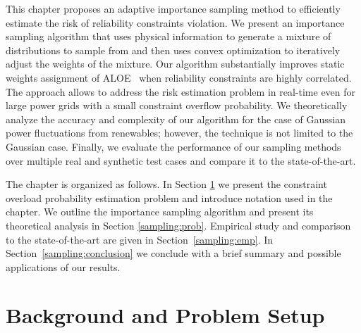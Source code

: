 This chapter proposes an adaptive importance sampling method to efficiently estimate the risk of reliability constraints violation.
We present an importance sampling algorithm that uses physical information to generate a mixture of distributions to sample from and then uses convex optimization to iteratively adjust the weights of the mixture. Our algorithm substantially improves static weights assignment of ALOE~\cite{owen2019importance} when reliability constraints are highly correlated.
The approach allows to address the risk estimation problem in real-time even for large power grids with a small constraint overflow probability. We theoretically analyze the accuracy and complexity of our algorithm for the case of Gaussian power fluctuations from renewables; however, the technique is not limited to the Gaussian case. Finally, we evaluate the performance of our sampling methods over multiple real and synthetic test cases and compare it to the state-of-the-art. 

The chapter is organized as follows. 
In Section \ref{sampling:setup} we present the constraint overload probability estimation problem and introduce notation used in the chapter. We outline the importance sampling algorithm and present its theoretical analysis in Section \ref{sampling:prob}. Empirical study and comparison to the state-of-the-art are given in Section~\ref{sampling:emp}. In Section~\ref{sampling:conclusion} we conclude  with a brief summary and possible applications of our results. 

\section{Background and Problem Setup}\label{sampling:setup}

